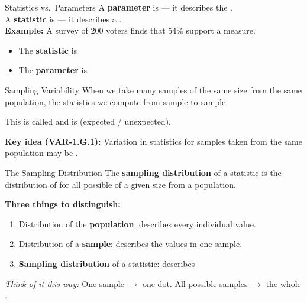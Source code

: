 \documentclass[10pt]{article}
\begin{document}
\begin{notesbox}{Statistics vs.\ Parameters}
A \textbf{parameter} is  --- it describes the .\\[6pt]
A \textbf{statistic} is  --- it describes a .\\[10pt]

\textbf{Example:} A survey of 200 voters finds that 54\% support a measure.
\begin{itemize}
  \item The \textbf{statistic} is 
  \item The \textbf{parameter} is 
\end{itemize}
\end{notesbox}

\vspace{0.1in}

\begin{notesbox}{Sampling Variability}
When we take many samples of the same size from the same population, the statistics we
compute  from sample to sample.

This is called  and is  (expected / unexpected).

\textbf{Key idea (VAR-1.G.1):} Variation in statistics for samples taken from the same
population may be .
\end{notesbox}

\vspace{0.1in}

\begin{notesbox}{The Sampling Distribution}
The \textbf{sampling distribution} of a statistic is the distribution of 
for all possible  of a given size from a population.

\textbf{Three things to distinguish:}
\begin{enumerate}
  \item Distribution of the \textbf{population}: describes every individual value.
  \item Distribution of a \textbf{sample}: describes the values in one sample.
  \item \textbf{Sampling distribution} of a statistic: describes 
\end{enumerate}

\textit{Think of it this way:} One sample $\to$ one dot. All possible samples $\to$
the whole .
\end{notesbox}
\end{document}
